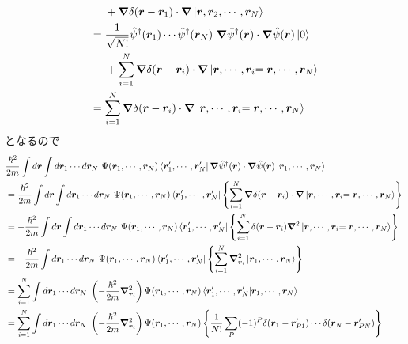 \documentclass[dvipdfmx, 11pt, a4paper]{jsarticle}
\theoremstyle{definition}
\numberwithin{equation}{section}
\begin{document}
\begin{derivationBox}
\begin{align}
            &\ \ \ \ + \bm{\nabla}\delta(\bm{r}-\bm{r}_1)\cdot \bm{\nabla}\ket{\bm{r},\bm{r}_2,\cdots,\bm{r}_N} \notag \\
            &= \frac{1}{\sqrt{N!}} \hat{\psi}^\dagger(\bm{r}_1)\cdots\hat{\psi}^\dagger(\bm{r}_N)\ \bm{\nabla}\hat{\psi}^\dagger(\bm{r})\cdot \bm{\nabla}\hat{\psi}(\bm{r})\ket{0} \notag \\
            &\ \ \ \ + \sum_{i=1}^N \bm{\nabla}\delta(\bm{r}-\bm{r}_i)\cdot \bm{\nabla}\ket{\bm{r},\cdots,\bm{r}_i{=\bm{r}},\cdots,\bm{r}_N} \notag \\
            &= \sum_{i=1}^N \bm{\nabla}\delta(\bm{r}-\bm{r}_i)\cdot \bm{\nabla}\ket{\bm{r},\cdots,\bm{r}_i{=\bm{r}},\cdots,\bm{r}_N}
        \end{align}
        となるので
        \begin{align}
            &\frac{\hbar^2}{2m}\int d\bm{r} \int d\bm{r}_1\cdots d\bm{r}_N\   \Psi(\bm{r}_1,\cdots,\bm{r}_N) \bra{\bm{r}'_1,\cdots,\bm{r}'_N}\bm{\nabla}\hat{\psi}^\dagger(\bm{r})\cdot\bm{\nabla}\hat{\psi}(\bm{r})\ket{\bm{r}_1, \cdots ,\bm{r}_N} \notag \\
            &=\frac{\hbar^2}{2m}\int d\bm{r} \int d\bm{r}_1\cdots d\bm{r}_N\   \Psi(\bm{r}_1,\cdots,\bm{r}_N) \bra{\bm{r}'_1,\cdots,\bm{r}'_N}\left\{ \sum_{i=1}^N \bm{\nabla}\delta(\bm{r}-\bm{r}_i)\cdot \bm{\nabla}\ket{\bm{r},\cdots,\bm{r}_i{=\bm{r}},\cdots,\bm{r}_N} \right\} \notag \\
            &= -\frac{\hbar^2}{2m}\int d\bm{r}\int d\bm{r}_1\cdots d\bm{r}_N\   \Psi(\bm{r}_1,\cdots,\bm{r}_N) \bra{\bm{r}'_1,\cdots,\bm{r}'_N}\left\{ \sum_{i=1}^N \delta(\bm{r}-\bm{r}_i) \bm{\nabla}^2\ket{\bm{r},\cdots,\bm{r}_i{=\bm{r}},\cdots,\bm{r}_N} \right\} \notag \\
            &= -\frac{\hbar^2}{2m}\int d\bm{r}_1\cdots d\bm{r}_N\   \Psi(\bm{r}_1,\cdots,\bm{r}_N) \bra{\bm{r}'_1,\cdots,\bm{r}'_N}\left\{ \sum_{i=1}^N \bm{\nabla}^2_{\bm{r}_i}\ket{\bm{r}_1,\cdots,\bm{r}_N} \right\} \notag \\
            &= \sum_{i=1}^N\int d\bm{r}_1\cdots d\bm{r}_N\   \left( -\frac{\hbar^2}{2m} \bm{\nabla}^2_{\bm{r}_i}\right)\Psi(\bm{r}_1,\cdots,\bm{r}_N) \braket{\bm{r}'_1,\cdots,\bm{r}'_N|\bm{r}_1,\cdots,\bm{r}_N} \notag \\
            &= \sum_{i=1}^N\int d\bm{r}_1\cdots d\bm{r}_N\   \left( -\frac{\hbar^2}{2m} \bm{\nabla}^2_{\bm{r}_i}\right)\Psi(\bm{r}_1,\cdots,\bm{r}_N) \left\{ \frac{1}{N!}\sum_P (-1)^P \delta(\bm{r}_1-\bm{r}'_{P1})\cdots\delta(\bm{r}_N-\bm{r}'_{PN})  \right\} \notag \\

\end{align}
\end{derivationBox}
\end{document}
